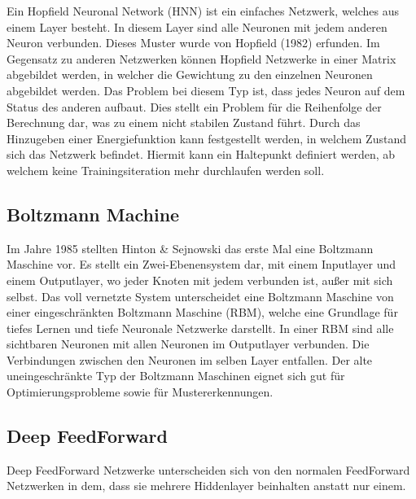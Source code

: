 Ein Hopfield Neuronal Network (HNN) \cite{demuth2014neural} ist ein einfaches Netzwerk, welches aus einem Layer besteht. 
In diesem Layer sind alle Neuronen mit jedem anderen Neuron verbunden. 
Dieses Muster wurde von Hopfield (1982) erfunden. 
Im Gegensatz zu anderen Netzwerken können Hopfield Netzwerke in einer Matrix abgebildet werden, in welcher die Gewichtung zu den einzelnen Neuronen abgebildet werden. 
Das Problem bei diesem Typ ist, dass jedes Neuron auf dem Status des anderen aufbaut.
Dies stellt ein Problem für die Reihenfolge der Berechnung dar, was zu einem nicht stabilen Zustand führt.
Durch das Hinzugeben einer Energiefunktion kann festgestellt werden, in welchem Zustand sich das Netzwerk befindet. 
Hiermit kann ein Haltepunkt definiert werden, ab welchem keine Trainingsiteration mehr durchlaufen werden soll. 

\subsection{Boltzmann Machine}

Im Jahre 1985 stellten Hinton \& Sejnowski \cite{Hinton:Boltzman:2007} das erste Mal eine Boltzmann Maschine vor.
Es stellt ein Zwei-Ebenensystem dar, mit einem Inputlayer und einem Outputlayer, wo jeder Knoten mit jedem verbunden ist, außer mit sich selbst.
Das voll vernetzte System unterscheidet eine Boltzmann Maschine von einer eingeschränkten Boltzmann Maschine (RBM), welche eine Grundlage für tiefes Lernen und tiefe Neuronale Netzwerke darstellt.
In einer RBM sind alle sichtbaren Neuronen mit allen Neuronen im Outputlayer verbunden. 
Die Verbindungen zwischen den Neuronen im selben Layer entfallen.
Der alte uneingeschränkte Typ der Boltzmann Maschinen eignet sich gut für Optimierungsprobleme sowie für Mustererkennungen.


\subsection{Deep FeedForward}
\label{subsec:DeepFeedForward}

Deep FeedForward Netzwerke unterscheiden sich von den normalen FeedForward Netzwerken in dem, dass sie mehrere Hiddenlayer beinhalten anstatt nur einem.

